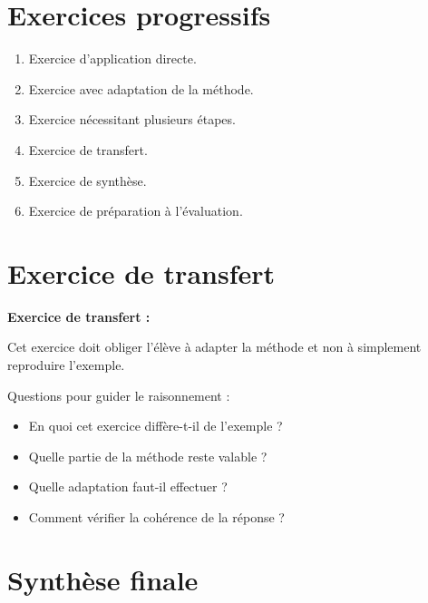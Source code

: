 \documentclass[11pt,a4paper]{article}
\begin{document}
\section{Exercices progressifs}

\begin{cadreactivite}
\begin{enumerate}
    \item Exercice d’application directe.
    \item Exercice avec adaptation de la méthode.
    \item Exercice nécessitant plusieurs étapes.
    \item Exercice de transfert.
    \item Exercice de synthèse.
    \item Exercice de préparation à l’évaluation.
\end{enumerate}
\end{cadreactivite}

\section{Exercice de transfert}

\begin{cadreenonce}
\textbf{Exercice de transfert :}

Cet exercice doit obliger l’élève à adapter la méthode et non à simplement reproduire l’exemple.
\end{cadreenonce}

\begin{cadreaide}
Questions pour guider le raisonnement :
\begin{itemize}
    \item En quoi cet exercice diffère-t-il de l’exemple ?
    \item Quelle partie de la méthode reste valable ?
    \item Quelle adaptation faut-il effectuer ?
    \item Comment vérifier la cohérence de la réponse ?
\end{itemize}
\end{cadreaide}

\section{Synthèse finale}
\end{document}
